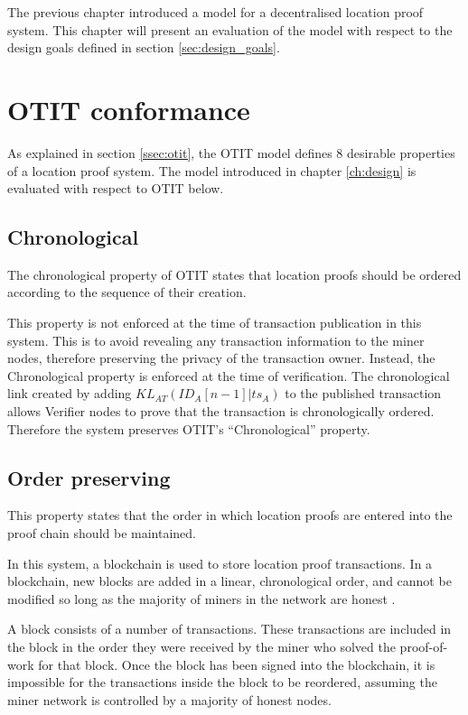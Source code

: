 The previous chapter introduced a model for a decentralised location proof system. This chapter will present an evaluation of the model with respect to the design goals defined in section \ref{sec:design_goals}.

\section{OTIT conformance}
As explained in section \ref{ssec:otit}, the OTIT model \cite{otit} defines 8 desirable properties of a location proof system. The model introduced in chapter \ref{ch:design} is evaluated with respect to OTIT below.

\subsection{Chronological}
The chronological property of OTIT states that location proofs should be ordered according to the sequence of their creation.

This property is not enforced at the time of transaction publication in this system. This is to avoid revealing any transaction information to the miner nodes, therefore preserving the privacy of the transaction owner. Instead, the Chronological property is enforced at the time of verification. The chronological link created by adding $KL_{AT}(ID_{A}[n-1]|ts_A)$ to the published transaction allows Verifier nodes to prove that the transaction is chronologically ordered. Therefore the system preserves OTIT's ``Chronological'' property.

\subsection{Order preserving}
This property states that the order in which location proofs are entered into the proof chain should be maintained.

In this system, a blockchain is used to store location proof transactions. In a blockchain, new blocks are added in a linear, chronological order, and cannot be modified so long as the majority of miners in the network are honest \cite{blueprint}.

A block consists of a number of transactions. These transactions are included in the block in the order they were received by the miner who solved the proof-of-work for that block. Once the block has been signed into the blockchain, it is impossible for the transactions inside the block to be reordered, assuming the miner network is controlled by a majority of honest nodes.

